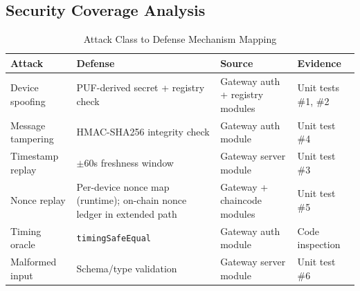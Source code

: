 \documentclass[conference]{IEEEtran}
\begin{document}
\subsection{Security Coverage Analysis}

\begin{table}[htbp]
\caption{Attack Class to Defense Mechanism Mapping}
\label{tab:security}
\centering
\begin{tabular}{p{1.7cm}p{2.3cm}p{1.5cm}p{1.5cm}}
\toprule
\textbf{Attack} & \textbf{Defense} & \textbf{Source} & \textbf{Evidence} \\
\midrule
Device spoofing    & PUF-derived secret + registry check & Gateway auth + registry modules & Unit tests \#1, \#2 \\
Message tampering  & HMAC-SHA256 integrity check         & Gateway auth module             & Unit test \#4 \\
Timestamp replay   & $\pm 60$s freshness window          & Gateway server module           & Unit test \#3 \\
Nonce replay       & Per-device nonce map (runtime); on-chain nonce ledger in extended path & Gateway + chaincode modules & Unit test \#5 \\
Timing oracle      & \texttt{timingSafeEqual}            & Gateway auth module             & Code inspection \\
Malformed input    & Schema/type validation               & Gateway server module           & Unit test \#6 \\
\bottomrule
\end{tabular}
\end{table}
\end{document}
